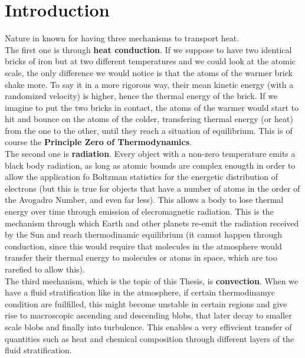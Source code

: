

\chapter{Introduction}
Nature in known for having three mechanisms to transport heat.  \\
The first one is through \textbf{heat conduction}. If we suppose to have two identical bricks of iron but at two different temperatures and we could look at the atomic scale, the only difference we would notice is that the atoms of the warmer brick shake more. To say it in a more rigorous way, their mean kinetic energy (with a randomized velocity) is higher, hence the thermal energy of the brick. If we imagine to put the two bricks in contact, the atoms of the warmer would start to hit and bounce on the atoms of the colder, transfering thermal energy (or heat) from the one to the other, until they reach a situation of equilibrium. This is of course the \textbf{Principle Zero of Thermodynamics}. \\
The second one is \textbf{radiation}. Every object with a non-zero temperature emits a black body radiation, as long as atomic bounds are complex enougth in order to allow the application fo Boltzman statistics for the energetic distribution of electrons (but this is true for objects that have a number of atoms in the order of the Avogadro Number, and even far less). This allows a body to lose thermal energy over time through emission of elecromagnetic radiation. This is the mechanism through which Earth and other planets re-emit the radiation received by the Sun and reach thermodinamic equilibrium (it cannot happen through conduction, since this would require that molecules in the atmosphere would transfer their thermal energy to molecules or atoms in space, which are too rarefied to allow this). \\
The third mechanism, which is the topic of this Thesis, is \textbf{convection}. When we have a fluid stratification like in the atmosphere, if certain thermodinamyc condition are fuilfilled, this might become unstable in certain regions and give rise to macroscopic ascending and descending blobs, that later decay to smaller scale blobs and finally into turbulence. This enables a very effivcient transfer of quantities such as heat and chemical composition through different layers of the fluid stratification. \\
